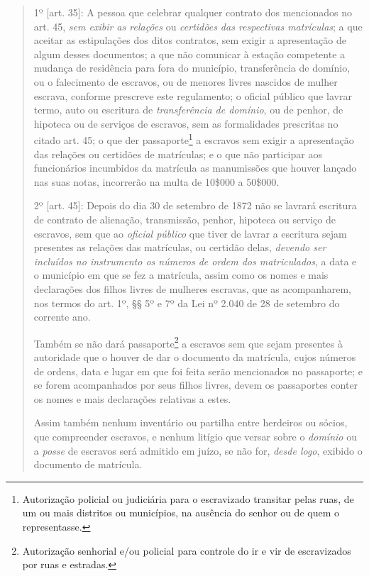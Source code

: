 \begin{quote}
1º {[}art. 35{]}: A pessoa que celebrar qualquer contrato dos
mencionados no art. 45, \emph{sem exibir as relações} ou \emph{certidões
das respectivas matrículas}; a que aceitar as estipulações dos ditos
contratos, sem exigir a apresentação de algum desses documentos; a que
não comunicar à estação competente a mudança de residência para fora do
município, transferência de domínio, ou o falecimento de escravos, ou de
menores livres nascidos de mulher escrava, conforme prescreve este
regulamento; o oficial público que lavrar termo, auto ou escritura de
\emph{transferência de domínio}, ou de penhor, de hipoteca ou de
serviços de escravos, sem as formalidades prescritas no citado art. 45;
o que der passaporte\footnote{Autorização policial ou judiciária para
  o escravizado transitar pelas ruas, de um ou mais distritos ou
  municípios, na ausência do senhor ou de quem o representasse.} a escravos
sem exigir a apresentação das relações ou certidões de matrículas; e o
que não participar aos funcionários incumbidos da matrícula as
manumissões que houver lançado nas suas notas, incorrerão na multa de
10\$000 a 50\$000.

2º {[}art. 45{]}: Depois do dia 30 de setembro de 1872 não se lavrará
escritura de contrato de alienação, transmissão, penhor, hipoteca ou
serviço de escravos, sem que ao \emph{oficial público} que tiver de
lavrar a escritura sejam presentes as relações das matrículas, ou
certidão delas, \emph{devendo ser incluídos no instrumento os números de
ordem dos matriculados}, a data e o município em que se fez a matrícula,
assim como os nomes e mais declarações dos filhos livres de mulheres
escravas, que as acompanharem, nos termos do art. 1º, §§ 5º e 7º da Lei
nº 2.040 de 28 de setembro do corrente ano.

Também se não dará passaporte\footnote{Autorização senhorial e/ou
  policial para controle do ir e vir de escravizados por ruas e
  estradas.} a escravos sem que sejam presentes à autoridade que o
houver de dar o documento da matrícula, cujos números de ordens, data e
lugar em que foi feita serão mencionados no passaporte; e se forem
acompanhados por seus filhos livres, devem os passaportes conter os
nomes e mais declarações relativas a estes.

Assim também nenhum inventário ou partilha entre herdeiros ou sócios,
que compreender escravos, e nenhum litígio que versar sobre o
\emph{domínio} ou a \emph{posse} de escravos será admitido em juízo, se
não for, \emph{desde logo}, exibido o documento de matrícula.
\end{quote}


